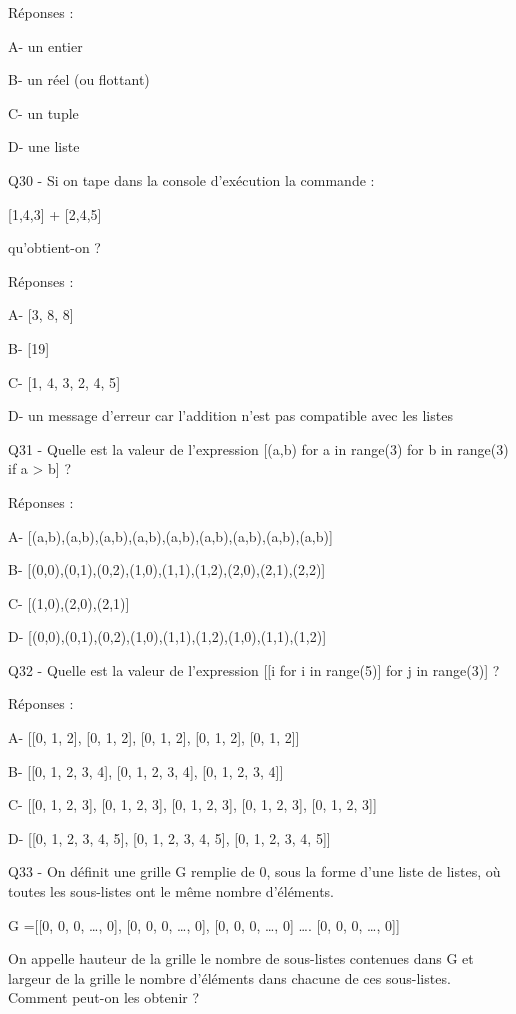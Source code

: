 \documentclass[
]{book}
\begin{document}
Réponses :

A- un entier

B- un réel (ou flottant)

C- un tuple

D- une liste

Q30 - Si on tape dans la console d'exécution la commande :

{[}1,4,3{]} + {[}2,4,5{]}

qu'obtient-on ?

Réponses :

A- {[}3, 8, 8{]}

B- {[}19{]}

C- {[}1, 4, 3, 2, 4, 5{]}

D- un message d'erreur car l'addition n'est pas compatible avec les listes

Q31 - Quelle est la valeur de l'expression {[}(a,b) for a in range(3) for b in range(3) if a \textgreater{} b{]} ?

Réponses :

A- {[}(a,b),(a,b),(a,b),(a,b),(a,b),(a,b),(a,b),(a,b),(a,b){]}

B- {[}(0,0),(0,1),(0,2),(1,0),(1,1),(1,2),(2,0),(2,1),(2,2){]}

C- {[}(1,0),(2,0),(2,1){]}

D- {[}(0,0),(0,1),(0,2),(1,0),(1,1),(1,2),(1,0),(1,1),(1,2){]}

Q32 - Quelle est la valeur de l'expression {[}{[}i for i in range(5){]} for j in range(3){]} ?

Réponses :

A- {[}{[}0, 1, 2{]}, {[}0, 1, 2{]}, {[}0, 1, 2{]}, {[}0, 1, 2{]}, {[}0, 1, 2{]}{]}

B- {[}{[}0, 1, 2, 3, 4{]}, {[}0, 1, 2, 3, 4{]}, {[}0, 1, 2, 3, 4{]}{]}

C- {[}{[}0, 1, 2, 3{]}, {[}0, 1, 2, 3{]}, {[}0, 1, 2, 3{]}, {[}0, 1, 2, 3{]}, {[}0, 1, 2, 3{]}{]}

D- {[}{[}0, 1, 2, 3, 4, 5{]}, {[}0, 1, 2, 3, 4, 5{]}, {[}0, 1, 2, 3, 4, 5{]}{]}

Q33 - On définit une grille G remplie de 0, sous la forme d'une liste de listes, où toutes les sous-listes ont le même nombre d'éléments.

G ={[}{[}0, 0, 0, \ldots, 0{]},
{[}0, 0, 0, \ldots, 0{]},
{[}0, 0, 0, \ldots, 0{]}
\ldots.
{[}0, 0, 0, \ldots, 0{]}{]}

On appelle hauteur de la grille le nombre de sous-listes contenues dans G et largeur de la grille le nombre d'éléments dans chacune de ces sous-listes. Comment peut-on les obtenir ?
\end{document}
